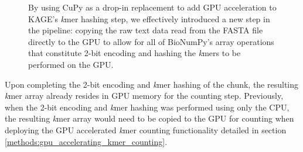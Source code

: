 \begin{figure}[H]
\begin{center}
\caption{
  By using CuPy as a drop-in replacement to add GPU acceleration to KAGE's \textit{k}mer hashing step, we effectively introduced a new step in the pipeline: copying the raw text data read from the FASTA file directly to the GPU to allow for all of BioNumPy's array operations that constitute 2-bit encoding and hashing the \textit{k}mers to be performed on the GPU.
}
\label{methods:gpu_accelerating_kmer_hashing:figures:gpu_pipeline}
\end{center}
\end{figure}

Upon completing the 2-bit encoding and \textit{k}mer hashing of the chunk, the resulting \textit{k}mer array already resides in GPU memory for the counting step.
Previously, when the 2-bit encoding and \textit{k}mer hashing was performed using only the CPU, the resulting \textit{k}mer array would need to be copied to the GPU for counting when deploying the GPU accelerated \textit{k}mer counting functionality detailed in section \ref{methods:gpu_accelerating_kmer_counting}.

